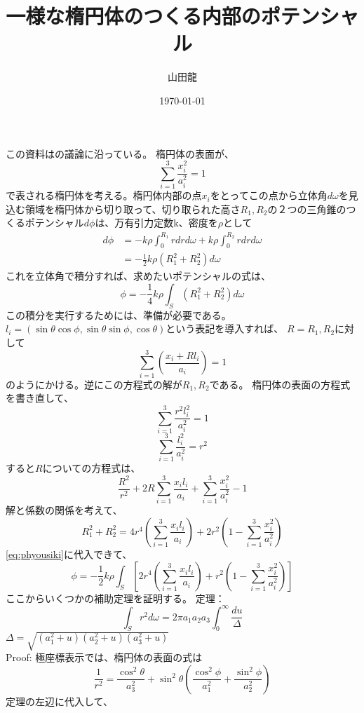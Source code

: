 \documentclass{jsarticle}
\date{\today}
\author{山田龍}
\title{一様な楕円体のつくる内部のポテンシャル}
\newcommand{\half}{\frac{1}{2}}
\newcommand{\beq}{\begin{equation}}
\newcommand{\eeq}{\end{equation}}
\newcommand{\xid}{x_i^2}
\newcommand{\lid}{l_i^2}
\newcommand{\aid}{a_i^2}
\newcommand{\sumit}{\sum_{i=1}^3}
\newcommand{\cosdt}{\cos^2\theta}
\newcommand{\sindt}{\sin^2\theta}
\newcommand{\cosdp}{\cos^2\phi}
\newcommand{\sindp}{\sin^2\phi}
\begin{document}
\maketitle
\section{}
この資料は\cite{Chandrasekhar1969-ny}の議論に沿っている。
楕円体の表面が、
\beq
\sum_{i=1}^3 \frac{\xid}{\aid} = 1
\eeq
で表される楕円体を考える。楕円体内部の点$x_i$をとってこの点から立体角$d\omega$を見込む領域を楕円体から切り取って、切り取られた高さ$R_1, R_2$の２つの三角錐のつくるポテンシャル$d\phi$は、万有引力定数k、密度を$\rho$として
\begin{align}
d\phi &= -k \rho \int_{0}^{R_1} r dr d\omega +
k \rho \int_{0}^{R_2} r dr d\omega\\
      &=  -\half k \rho (R_1^2 + R_2^2) d\omega
\end{align}
これを立体角で積分すれば、求めたいポテンシャルの式は、
\beq
\phi = -\frac{1}{4} k \rho \int_S (R_1^2 + R_2^2) d\omega\label{eq:phyousiki}
\eeq
この積分を実行するためには、準備が必要である。
$l_i = (\sin\theta \cos\phi, \sin\theta \sin\phi ,\cos\theta)$という表記を導入すれば、
$R = R_1, R_2$に対して
\beq
\sum_{i=1}^3 \left (\frac{x_i + R l_i}{a_i} \right) = 1\label{eq:daenl}
\eeq
のようにかける。逆にこの方程式の解が$R_1,R_2$である。
楕円体の表面の方程式を書き直して、
\beq
\sum_{i=1}^3 \frac{r^2 \lid}{\aid} = 1
\eeq
\beq
\sum_{i=1}^3 \frac{\lid}{\aid} = r^2
\eeq
すると$R$についての方程式は、
\beq
\frac{R^2}{r^2} + 2R\sumit \frac{x_i l_i}{a_i} + \sumit \frac{\xid}{\aid} - 1
\eeq
解と係数の関係を考えて、
\beq
R_1^2 + R_2^2 = 4r^4 \left(\sumit \frac{x_i l_i}{a_i} \right) + 2r^2 \left(1 -  \sumit \frac{\xid}{\aid}
\right)
\eeq
\eqref{eq:phyousiki}に代入できて、
\beq
\phi = -\frac{1}{2} k \rho \int_S \left[2r^4 \left(\sumit \frac{x_i l_i}{a_i} \right) + r^2 \left(1 -  \sumit \frac{\xid}{\aid}\right)\right]
\label{eq:steptwo}
\eeq
ここからいくつかの補助定理を証明する。
定理：
\beq
\int _S r^2 d\omega = 2 \pi a_1 a_2 a_3 \int_0^{\infty} \frac{du}{\Delta}
\eeq
$\Delta = \sqrt{(a_1^2 + u)(a_2^2 + u)(a_3^2 + u)}$\\
Proof:
極座標表示では、楕円体の表面の式は
\beq
\frac{1}{r^2} = \frac{\cosdt}{a_3^2} + \sindt(\frac{\cosdp}{a_1^2} + \frac{\sindp}{a_2^2})
\eeq
定理の左辺に代入して、
\end{document}
